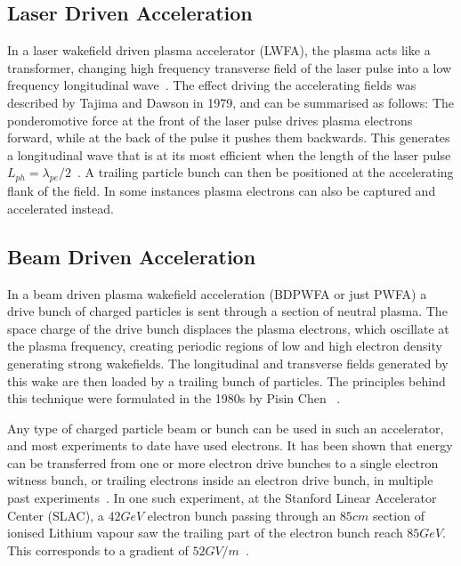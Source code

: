 \subsection{Laser Driven Acceleration}
\label{Int:LWFA}

In a laser wakefield driven plasma accelerator (LWFA), the plasma acts like a transformer, changing high frequency transverse field of the laser pulse into a low frequency longitudinal wave~\cite{malka:2009}.
The effect driving the accelerating fields was described by Tajima and Dawson in 1979, and can be summarised as follows:
The ponderomotive force at the front of the laser pulse drives plasma electrons forward, while at the back of the pulse it pushes them backwards.
This generates a longitudinal wave that is at its most efficient when the length of the laser pulse $L_{ph} = \lambda_{pe}/2$~\cite{tajima:1979}.
A trailing particle bunch can then be positioned at the accelerating flank of the field.
In some instances plasma electrons can also be captured and accelerated instead.

\subsection{Beam Driven Acceleration}
\label{Int:BDPWFA}

In a beam driven plasma wakefield acceleration (BDPWFA or just PWFA) a drive bunch of charged particles is sent through a section of neutral plasma.
The space charge of the drive bunch displaces the plasma electrons, which oscillate at the plasma frequency, creating periodic regions of low and high electron density generating strong wakefields.
The longitudinal and transverse fields generated by this wake are then loaded by a trailing bunch of particles.
The principles behind this technique were formulated in the 1980s by Pisin Chen \etal~\cite{chen:1985}.

Any type of charged particle beam or bunch can be used in such an accelerator, and most experiments to date have used electrons.
It has been shown that energy can be transferred from one or more electron drive bunches to a single electron witness bunch, or trailing electrons inside an electron drive bunch, in multiple past experiments~\cite{rosenzweig:1988, blumenfeld:2007, kallos:2007, litos:2014, nakajima:1990}.
In one such experiment, at the Stanford Linear Accelerator Center (SLAC), a $42\unit{GeV}$ electron bunch passing through an $85\unit{cm}$ section of ionised Lithium vapour saw the trailing part of the electron bunch reach $85\unit{GeV}$.
This corresponds to a gradient of $52\unit{GV/m}$~\cite{blumenfeld:2007}.

